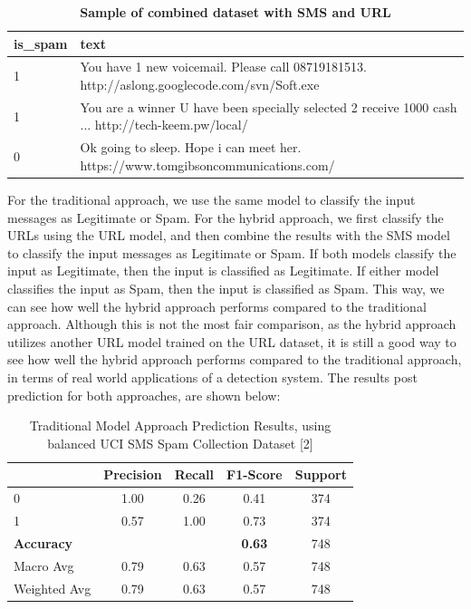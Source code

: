 \documentclass{article}
\begin{document}
\begin{table}[htbp]
    \centering
    \caption{\textbf{Sample of combined dataset with SMS and URL}}
    \begin{tabular}{ll}
    \toprule
    is\_spam & text \\
    \midrule
    1 & You have 1 new voicemail. Please call 08719181513. http://aslong.googlecode.com/svn/Soft.exe \\
    1 & You are a winner U have been specially selected 2 receive 1000 cash ... http://tech-keem.pw/local/ \\ 
    0 & Ok going to sleep. Hope i can meet her. https://www.tomgibsoncommunications.com/ \\
    \bottomrule
    \end{tabular}
    \label{tab:csv_sample}
\end{table}

\noindent
For the traditional approach, we use the same model to classify the input messages as Legitimate or Spam. For the hybrid approach, we first classify the URLs using the URL model, and then combine the results with the SMS model to classify the input messages as Legitimate or Spam. If both models classify the input as Legitimate, then the input is classified as Legitimate. If either model classifies the input as Spam, then the input is classified as Spam. This way, we can see how well the hybrid approach performs compared to the traditional approach. Although this is not the most fair comparison, as the hybrid approach utilizes another URL model trained on the URL dataset, it is still a good way to see how well the hybrid approach performs compared to the traditional approach, in terms of real world applications of a detection system. The results post prediction for both approaches, are shown below:


\begin{table}[htbp]
    \centering
    \caption{Traditional Model Approach Prediction Results, using balanced UCI SMS Spam Collection Dataset [2]}
    \begin{tabular}{l c c c c}
    \toprule
     & Precision & Recall & F1-Score & Support \\
    \midrule
    0 & 1.00 & 0.26 & 0.41 & 374 \\
    1 & 0.57 & 1.00 & 0.73 & 374 \\
    \midrule
    \textbf{Accuracy} & & & \textbf{0.63} & 748 \\
    Macro Avg & 0.79 & 0.63 & 0.57 & 748 \\
    Weighted Avg & 0.79 & 0.63 & 0.57 & 748 \\
    \bottomrule
    \end{tabular}
    \label{tab:classification_report_4}
\end{table}
\end{document}
